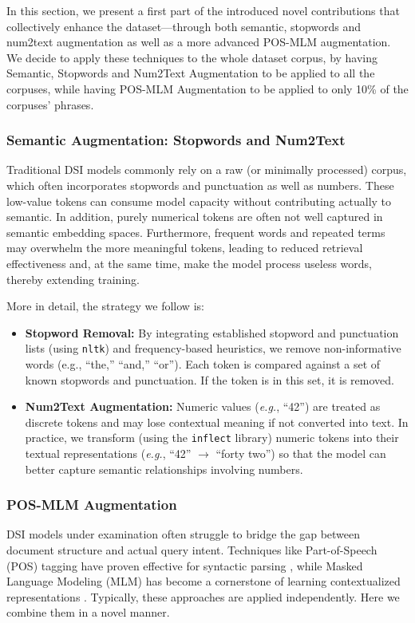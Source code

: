In this section, we present a first part of the introduced novel contributions that collectively enhance the dataset—through both semantic, stopwords and num2text augmentation as well as a more advanced POS-MLM augmentation. We decide to apply these techniques to the whole dataset corpus, by having Semantic, Stopwords and Num2Text Augmentation to be applied to all the corpuses, while having POS-MLM Augmentation to be applied to only 10\% of the corpuses' phrases.

\subsubsection{Semantic Augmentation: Stopwords and Num2Text}
Traditional DSI models commonly rely on a raw (or minimally processed) corpus, which often incorporates stopwords and punctuation as well as numbers. These low-value tokens can consume model capacity without contributing actually to semantic. In addition, purely numerical tokens are often not well captured in semantic embedding spaces. Furthermore, frequent words and repeated terms may overwhelm the more meaningful tokens, leading to reduced retrieval effectiveness and, at the same time, make the model process useless words, thereby extending training.

More in detail, the strategy we follow is:
\begin{itemize}
    \item \textbf{Stopword Removal:} By integrating established stopword and punctuation lists (using \texttt{nltk}) and frequency-based heuristics, we remove non-informative words (e.g., ``the,'' ``and,'' ``or''). Each token is compared against a set of known stopwords and punctuation. If the token is in this set, it is removed.
    \item \textbf{Num2Text Augmentation:} Numeric values (\textit{e.g.}, ``42'') are treated as discrete tokens and may lose contextual meaning if not converted into text. In practice, we transform (using the \texttt{inflect} library) numeric tokens into their textual representations (\textit{e.g.}, ``42'' $\to$ ``forty two'') so that the model can better capture semantic relationships involving numbers.
\end{itemize}

\subsubsection{POS-MLM Augmentation}
DSI models under examination often struggle to bridge the gap between document structure and actual query intent. Techniques like Part-of-Speech (POS) tagging have proven effective for syntactic parsing \cite{toutanova2003feature}, while Masked Language Modeling (MLM) has become a cornerstone of learning contextualized representations \cite{devlin2018bert}. Typically, these approaches are applied independently. Here we combine them in a novel manner.

